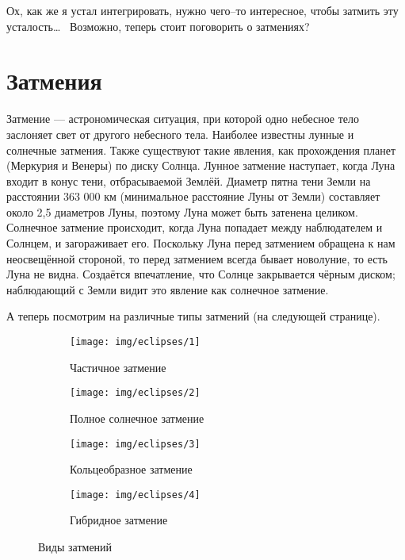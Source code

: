 \documentclass[12pt]{article}
\numberwithin{equation}{section} %
\theoremstyle{definition}\newtheorem{defi}{Определение}
\begin{document}
Ох, как же я устал интегрировать, нужно чего--то интересное, чтобы затмить эту усталость\dots~ Возможно, теперь стоит поговорить о затмениях?

\section{Затмения}

Затмение — астрономическая ситуация, при которой одно небесное тело заслоняет свет от другого небесного тела. Наиболее известны лунные и солнечные затмения. Также существуют такие явления, как прохождения планет (Меркурия и Венеры) по диску Солнца. Лунное затмение наступает, когда Луна входит в конус тени, отбрасываемой Землёй. Диаметр пятна тени Земли на расстоянии 363 000 км (минимальное расстояние Луны от Земли) составляет около 2,5 диаметров Луны, поэтому Луна может быть затенена целиком. Солнечное затмение происходит, когда Луна попадает между наблюдателем и Солнцем, и загораживает его. Поскольку Луна перед затмением обращена к нам неосвещённой стороной, то перед затмением всегда бывает новолуние, то есть Луна не видна. Создаётся впечатление, что Солнце закрывается чёрным диском; наблюдающий с Земли видит это явление как солнечное затмение.

А теперь посмотрим на различные типы затмений (на следующей странице).

\newpage
\begin{figure}
  \centering
  \begin{subfigure}[b]{0.45\textwidth}
    \texttt{[image: img/eclipses/1]}
    \caption{Частичное затмение}  
  \end{subfigure}
  
  \begin{subfigure}[b]{0.45\textwidth}
    \texttt{[image: img/eclipses/2]}
    \caption{Полное солнечное затмение}  
  \end{subfigure}
  \centering
  \begin{subfigure}[b]{0.45\textwidth}
    \texttt{[image: img/eclipses/3]}
    \caption{Кольцеобразное затмение}  
  \end{subfigure}
  
  \begin{subfigure}[b]{0.45\textwidth}
    \texttt{[image: img/eclipses/4]}
    \caption{Гибридное затмение}  
  \end{subfigure}
  
  \caption{Виды затмений}
\end{figure}
\end{document}
